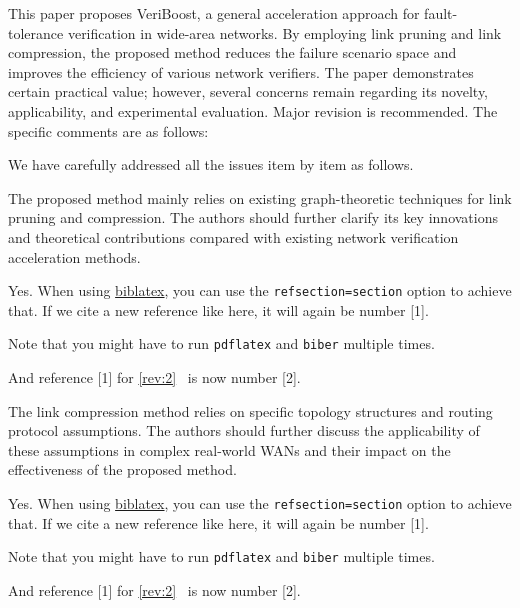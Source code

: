 \reviewer%

\begin{generalcomment}
	This paper proposes VeriBoost, 
	a general acceleration approach for fault-tolerance verification in wide-area networks. 
	By employing link pruning and link compression, 
	the proposed method reduces the failure scenario space and improves the efficiency of various network verifiers. 
	The paper demonstrates certain practical value; 
	however, several concerns remain regarding its novelty, applicability, and experimental evaluation. 
	Major revision is recommended. The specific comments are as follows:
\end{generalcomment}
\begin{revresponse}
	We have carefully addressed all the issues item by item as follows.
\end{revresponse}

\begin{revcomment}
	The proposed method mainly relies on existing graph-theoretic techniques for link pruning and compression. 
	The authors should further clarify its key innovations and theoretical contributions compared with existing network verification acceleration methods.
\end{revcomment}
\begin{revresponse}
	Yes. When using \href{https://www.ctan.org/pkg/biblatex}{biblatex}, you can use the \texttt{refsection=section} option to achieve that.
	If we cite a new reference like \cite{Besser2021} here, it will again be number [1].

	Note that you might have to run \texttt{pdflatex} and \texttt{biber} multiple times.

	And reference [1] for \autoref{rev:2}~\cite{ReviewerReference} is now number [2].
\end{revresponse}

\begin{revcomment}
	The link compression method relies on specific topology structures and routing protocol assumptions. 
	The authors should further discuss the applicability of these assumptions in complex real-world WANs and their impact on the effectiveness of the proposed method.
\end{revcomment}
\begin{revresponse}
	Yes. When using \href{https://www.ctan.org/pkg/biblatex}{biblatex}, you can use the \texttt{refsection=section} option to achieve that.
	If we cite a new reference like \cite{Besser2021} here, it will again be number [1].

	Note that you might have to run \texttt{pdflatex} and \texttt{biber} multiple times.

	And reference [1] for \autoref{rev:2}~\cite{ReviewerReference} is now number [2].
\end{revresponse}

